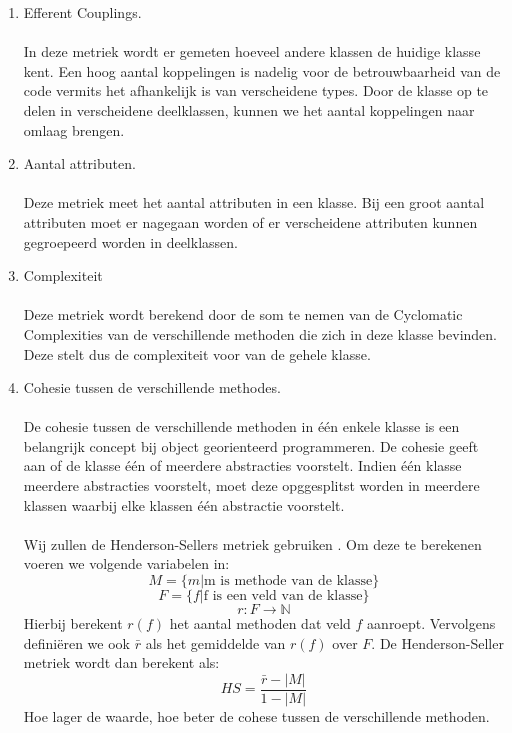 \begin{enumerate}
	\item 
		Efferent Couplings.
		\\
		\\
		In deze metriek wordt er gemeten hoeveel andere klassen de huidige klasse kent. Een hoog aantal koppelingen is nadelig voor de betrouwbaarheid van de code vermits het afhankelijk is van verscheidene types. Door de klasse op te delen in verscheidene deelklassen, kunnen we het aantal koppelingen naar omlaag brengen.
	\item
		Aantal attributen.
		\\
		\\
		Deze metriek meet het aantal attributen in een klasse. Bij een groot aantal attributen moet er nagegaan worden of er verscheidene attributen kunnen gegroepeerd worden in deelklassen.
	
	\item
		Complexiteit
		\\
		\\
		Deze metriek wordt berekend door de som te nemen van de Cyclomatic Complexities van de verschillende methoden die zich in deze klasse bevinden. Deze stelt dus de complexiteit voor van de gehele klasse.
		
	\item 
	{
		Cohesie tussen de verschillende methodes.
		\\
		\\
		De cohesie tussen de verschillende methoden in \'{e}\'{e}n enkele klasse is een belangrijk concept bij object georienteerd programmeren. De cohesie geeft aan of de klasse \'{e}\'{e}n of meerdere abstracties voorstelt. Indien \'{e}\'{e}n klasse meerdere abstracties voorstelt, moet deze opggesplitst worden in meerdere klassen waarbij elke klassen \'{e}\'{e}n abstractie voorstelt.
		\\
		\\
		Wij zullen de Henderson-Sellers metriek gebruiken \cite{HendersonSellers}. Om deze te berekenen voeren we volgende variabelen in: 
		$$ M = \{ m | \text{m is methode van de klasse} \} $$
		$$ F = \{ f | \text{f is een veld van de klasse} \} $$
		$$ r : F \rightarrow \mathbb{N} $$
Hierbij berekent $r(f)$ het aantal methoden dat veld $f$ aanroept. Vervolgens defini\"{e}ren we ook $\bar{r}$ als het gemiddelde van $r(f)$ over $F$. De Henderson-Seller metriek wordt dan berekent als:
		$$ HS = \frac{\bar{r} - |M|}{1 - |M|} $$
		Hoe lager de waarde, hoe beter de cohese tussen de verschillende methoden.
	} %
\end{enumerate}